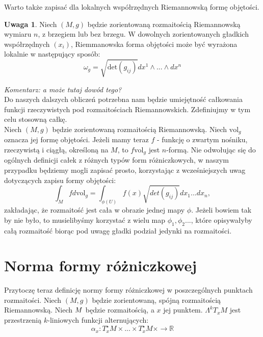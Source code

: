 \documentclass[licencjacka]{pracamgr}
\theoremstyle{definition}
\theoremstyle{definition}
\newtheorem{remark}{Uwaga}[section]
\theoremstyle{plain}
\theoremstyle{plain}
\def\M{\ensuremath M}
\begin{document}
Warto także zapisać dla lokalnych współrzędnych Riemannowską formę objętości. 
\begin{remark} %
Niech $(M, g)$ będzie zorientowaną rozmaitością Riemannowską wymiaru $n$, z
brzegiem lub bez brzegu. W dowolnych zorientowanych gładkich współrzędnych
$(x_i)$, Riemmanowska forma objętości może być wyrażona lokalnie w następujący
sposób:
\[
    \omega_g = \sqrt{\text{det}(g_{ij})} dx^1 \wedge ... \wedge dx^n
\]
\end{remark}
\emph{Komentarz: a może tutaj dowód tego? }\\

Do naszych dalszych obliczeń potrzebna nam będzie umiejętność całkowania
funkcji rzeczywistych pod rozmaitościach Riemannowskich. Zdefiniujmy w tym celu
stosowną całkę. \\

Niech $(M, g)$ będzie zorientowaną rozmaitością Riemannowską. Niech
$\text{vol}_g$ oznacza jej formę objętości. Jeżeli mamy teraz $f$ -
funkcję o zwartym nośniku, rzeczywistą i ciągłą, określoną na $M$, to
$f \text{vol}_g$ jest $n$-formą.
Nie odwołując się do ogólnych definicji całek z różnych typów form
różniczkowych, w naszym przypadku będziemy mogli zapisać prosto, korzystając z
wcześniejszych uwag dotyczących zapisu formy objętości:
\[ %
  \int_M f d \text{vol}_g = \int_{\phi (U)} f(x) \sqrt{det(g_{ij})} dx_1 ... dx_n,
\]
zakładając, że rozmaitość jest cała w obrazie jednej mapy
$\phi$. Jeżeli bowiem tak by nie było, to musielibyśmy korzystać z
wielu map $\phi_1, \phi_2 ... $, które opisywałyby całą rozmaitość
biorąc pod uwagę gładki podział jedynki na rozmaitości. \\



\section{Norma formy różniczkowej}

Przytoczę teraz definicję normy formy różniczkowej w poszczególnych punktach
rozmaitości. Niech $(M, g)$ będzie zorientowaną, spójną %
rozmaitością Riemannowską. Niech $\M$ będzie rozmaitością, a $x$ jej punktem.
$\Lambda^k T_x M$ jest przestrzenią $k$-liniowych funkcji alternujących:
\[
    \alpha_x:T_x^\star M \times ... \times T_x^\star M \times \rightarrow \mathbb{R}
\] \\
\end{document}
